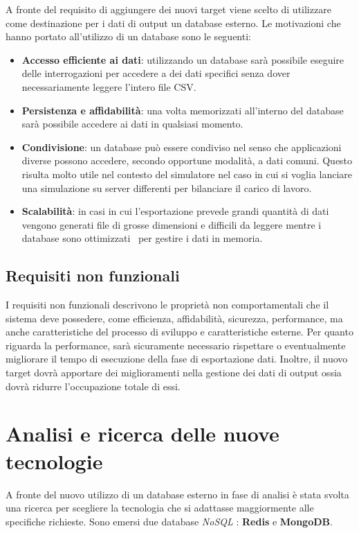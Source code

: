 \documentclass[12pt,a4paper,openright,oneside]{book}
\begin{document}
A fronte del requisito di aggiungere dei nuovi target viene scelto di utilizzare come destinazione per i dati di output un database esterno.
Le motivazioni che hanno portato all'utilizzo di un database sono le seguenti:
\begin{itemize}
    \item \textbf{Accesso efficiente ai dati}: utilizzando un database sarà possibile eseguire delle interrogazioni per accedere a dei dati specifici senza dover necessariamente leggere l'intero file CSV.
    \item \textbf{Persistenza e affidabilità}: una volta memorizzati all'interno del database sarà possibile accedere ai dati in qualsiasi momento.
    \item\textbf{Condivisione}: un database può essere condiviso nel senso che applicazioni diverse possono accedere, secondo opportune modalità, a dati comuni. Questo risulta molto utile nel contesto del simulatore nel caso in cui si voglia lanciare una simulazione su server differenti per bilanciare il carico di lavoro.
    \item\textbf{Scalabilità}: in casi in cui l'esportazione prevede grandi quantità di dati vengono generati file di grosse dimensioni e difficili da leggere mentre i database sono ottimizzati~\cite{dbsvsfile} per gestire i dati in memoria.
\end{itemize}


\subsection{Requisiti non funzionali}
I requisiti non funzionali descrivono le proprietà non comportamentali che il sistema deve possedere, come efficienza, affidabilità, sicurezza, performance, ma anche caratteristiche del processo di sviluppo e caratteristiche esterne.
Per quanto riguarda la performance, sarà sicuramente necessario rispettare o eventualmente migliorare il tempo di esecuzione della fase di esportazione dati.
Inoltre, il nuovo target dovrà apportare dei miglioramenti nella gestione dei dati di output ossia dovrà ridurre l'occupazione totale di essi.



\section{Analisi e ricerca delle nuove tecnologie}
A fronte del nuovo utilizzo di un database esterno in fase di analisi è stata svolta una ricerca per scegliere la tecnologia che si adattasse maggiormente alle specifiche richieste.
Sono emersi due database \textit{NoSQL} : \textbf{Redis} e \textbf{MongoDB}.
\end{document}
